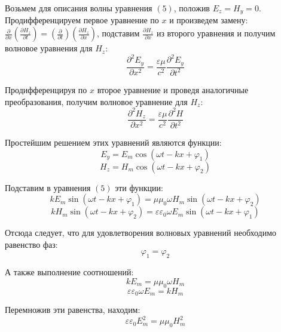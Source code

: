 \documentclass{article}
\begin{document}
	Возьмем для описания волны уравнения $(5)$, положив $E_z=H_y=0$. Продифференцируем первое уравнение по $x$ и произведем замену: $\frac{\partial}{\partial x}(\frac{\partial H_z}{\partial t})=(\frac{\partial}{\partial t})(\frac{\partial H_z}{\partial x})$, подставим $\frac{\partial H_z}{\partial x}$ из второго уравнения и получим волновое уравнения для $H_z$:
	\begin{equation}
		\frac{\partial^2 E_y}{\partial x^2} = \frac{\varepsilon \mu}{c^2} \frac{\partial^2 E_y}{\partial t^2}
	\end{equation}

	Продифференцируя по $x$ второе уравнение и проведя аналогичные преобразования, получим волновое уравнение для $H_z$:
	\begin{equation}
		\frac{\partial^2 H_z}{\partial x^2}=\frac{\varepsilon \mu}{c^2}\frac{\partial^2 H}{\partial t^2}
	\end{equation}

	Простейшим решением этих уравнений являются функции:
	\begin{equation}
		E_y=E_m\cos(\omega t-kx+\varphi_1)
	\end{equation}
	\begin{equation}
		H_z=H_m\cos(\omega t-kx+\varphi_2)
	\end{equation}

	Подставим в уравнения $(5)$ эти функции:
	\begin{equation}
		kE_m\sin(\omega t - kx + \varphi_1) = \mu\mu_0\omega H_m\sin(\omega t - kx + \varphi_2)
	\end{equation}
	\begin{equation}
		kH_m\sin(\omega t - kx + \varphi_2) = \varepsilon\varepsilon_0\omega E_m\sin(\omega t - kx + \varphi_1)
	\end{equation}

	Отсюда следует, что для удовлетворения волновых уравнений необходимо равенство фаз:
	\begin{equation}
		\varphi_1=\varphi_2
	\end{equation}

	А также выполнение соотношений:
	\begin{equation}
		kE_m = \mu\mu_0\omega H_m
	\end{equation}
	\begin{equation}
		\varepsilon\varepsilon_0\omega E_m=kH_m
	\end{equation}

	Перемножив эти равенства, находим:
	\begin{equation}
		\varepsilon\varepsilon_0E_m^2 = \mu\mu_0 H_m^2
	\end{equation}
\end{document}
